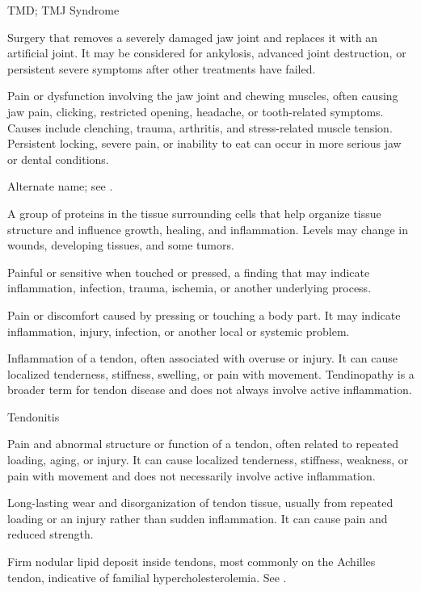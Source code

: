 \synonyms
TMD; TMJ Syndrome

 Surgery that removes a severely damaged jaw joint and replaces it with an artificial joint. It may be considered for ankylosis, advanced joint destruction, or persistent severe symptoms after other treatments have failed.

 Pain or dysfunction involving the jaw joint and chewing muscles, often causing jaw pain, clicking, restricted
opening, headache, or tooth-related symptoms. Causes include clenching, trauma, arthritis, and stress-related muscle
tension. Persistent locking, severe pain, or inability to eat can occur in more serious jaw or dental conditions.

 Alternate name; see .

 A group of proteins in the tissue surrounding cells that help organize tissue structure and influence growth, healing, and inflammation. Levels may change in wounds, developing tissues, and some tumors.

 Painful or sensitive when touched or pressed, a finding that may indicate inflammation, infection, trauma, ischemia, or another underlying process.

 Pain or discomfort caused by pressing or touching a body part. It may indicate inflammation, injury, infection, or another local or systemic problem.

 Inflammation of a tendon, often associated with overuse or injury. It can cause localized tenderness, stiffness, swelling, or pain with movement. Tendinopathy is a broader term for tendon disease and does not always involve active inflammation.

\synonyms
Tendonitis

 Pain and abnormal structure or function of a tendon, often related to repeated loading, aging, or injury. It can cause localized tenderness, stiffness, weakness, or pain with movement and does not necessarily involve active inflammation.

 Long-lasting wear and disorganization of tendon tissue, usually from repeated loading or an injury rather than sudden inflammation. It can cause pain and reduced strength.

 Firm nodular lipid deposit inside tendons, most commonly on the Achilles tendon, indicative of familial hypercholesterolemia. See .

